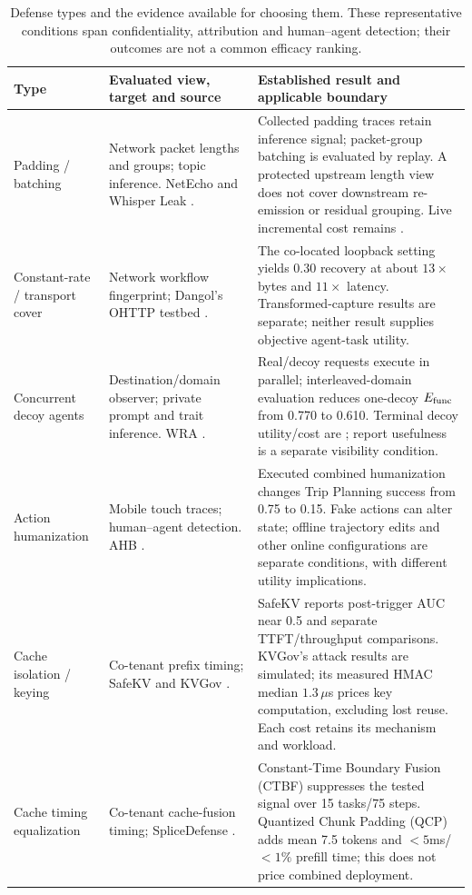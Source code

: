 \begin{table}[t]\centering\footnotesize
\caption{Defense types and the evidence available for choosing them. These representative conditions span confidentiality, attribution and human--agent detection; their outcomes are not a common efficacy ranking.}\label{tab:defense-types}
\begin{tabularx}{\textwidth}{@{}p{}p{}Y@{}}\toprule
Type & Evaluated view, target and source & Established result and applicable boundary\\\midrule
Padding / batching & Network packet lengths and groups; topic inference. NetEcho and Whisper Leak \cite{netecho2025,whisperleak2025}. & Collected padding traces retain inference signal; packet-group batching is evaluated by replay. A protected upstream length view does not cover downstream re-emission or residual grouping. Live incremental cost remains \NRR{}.\\
Constant-rate / transport cover & Network workflow fingerprint; Dangol's OHTTP testbed \cite{dangol2026workflow}. & The co-located loopback setting yields 0.30 recovery at about $13\times$ bytes and $11\times$ latency. Transformed-capture results are separate; neither result supplies objective agent-task utility.\\
Concurrent decoy agents & Destination/domain observer; private prompt and trait inference. WRA \cite{jeong2026wra}. & Real/decoy requests execute in parallel; interleaved-domain evaluation reduces one-decoy $E_{\rm func}$ from 0.770 to 0.610. Terminal decoy utility/cost are \NRR{}; report usefulness is a separate visibility condition.\\
Action humanization & Mobile touch traces; human--agent detection. AHB \cite{zhu2026turing}. & Executed combined humanization changes Trip Planning success from 0.75 to 0.15. Fake actions can alter state; offline trajectory edits and other online configurations are separate conditions, with different utility implications.\\
Cache isolation / keying & Co-tenant prefix timing; SafeKV and KVGov \cite{chu2025safekv,addagada2026kvgov}. & SafeKV reports post-trigger AUC near 0.5 and separate TTFT/throughput comparisons. KVGov's attack results are simulated; its measured HMAC median $1.3\,\mu$s prices key computation, excluding lost reuse. Each cost retains its mechanism and workload.\\
Cache timing equalization & Co-tenant cache-fusion timing; SpliceDefense \cite{spliceleak2026}. & Constant-Time Boundary Fusion (CTBF) suppresses the tested signal over 15 tasks/75 steps. Quantized Chunk Padding (QCP) adds mean 7.5 tokens and $<5$ms/$<1\%$ prefill time; this does not price combined deployment.\\

\end{tabularx}
\end{table}
